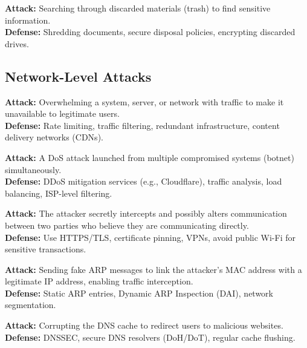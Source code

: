 \documentclass[11pt,a4paper]{article}
\begin{document}
\begin{alertbox}
\textbf{Attack:} Searching through discarded materials (trash) to find sensitive information.\\
\textbf{Defense:} Shredding documents, secure disposal policies, encrypting discarded drives.
\end{alertbox}

\subsection{Network-Level Attacks}

\begin{alertbox}
\textbf{Attack:} Overwhelming a system, server, or network with traffic to make it unavailable to legitimate users.\\
\textbf{Defense:} Rate limiting, traffic filtering, redundant infrastructure, content delivery networks (CDNs).
\end{alertbox}

\begin{alertbox}
\textbf{Attack:} A DoS attack launched from multiple compromised systems (botnet) simultaneously.\\
\textbf{Defense:} DDoS mitigation services (e.g., Cloudflare), traffic analysis, load balancing, ISP-level filtering.
\end{alertbox}

\begin{alertbox}
\textbf{Attack:} The attacker secretly intercepts and possibly alters communication between two parties who believe they are communicating directly.\\
\textbf{Defense:} Use HTTPS/TLS, certificate pinning, VPNs, avoid public Wi-Fi for sensitive transactions.
\end{alertbox}

\begin{alertbox}
\textbf{Attack:} Sending fake ARP messages to link the attacker's MAC address with a legitimate IP address, enabling traffic interception.\\
\textbf{Defense:} Static ARP entries, Dynamic ARP Inspection (DAI), network segmentation.
\end{alertbox}

\begin{alertbox}
\textbf{Attack:} Corrupting the DNS cache to redirect users to malicious websites.\\
\textbf{Defense:} DNSSEC, secure DNS resolvers (DoH/DoT), regular cache flushing.
\end{alertbox}
\end{document}
